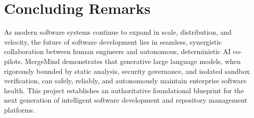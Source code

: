\documentclass[12pt,a4paper,oneside]{report}
\begin{document}
\section{Concluding Remarks}
\label{sec:concluding-remarks}

As modern software systems continue to expand in scale, distribution, and velocity, the future of software development lies in seamless, synergistic collaboration between human engineers and autonomous, deterministic AI co-pilots. MergeMind demonstrates that generative large language models, when rigorously bounded by static analysis, security governance, and isolated sandbox verification, can safely, reliably, and autonomously maintain enterprise software health. This project establishes an authoritative foundational blueprint for the next generation of intelligent software development and repository management platforms.

\cleardoublepage




\end{document}
